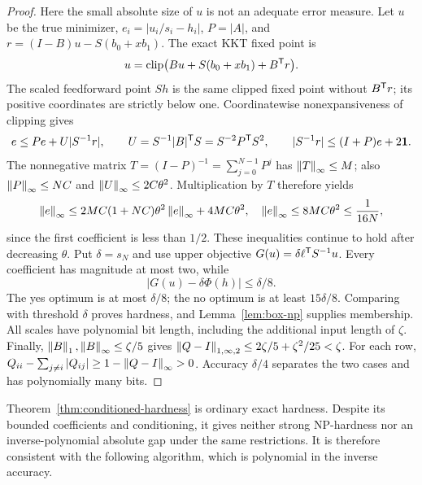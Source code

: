 \begin{proof}
Here the small absolute size of \(u\) is not an adequate error measure.
Let \(u\) be the true minimizer, \(e_i=|u_i/s_i-h_i|\),
\(P=|A|\), and \(r=(I-B)u-S(b_0+xb_1)\). The exact KKT fixed point is
\[
 u=\operatorname{clip}\bigl(Bu+S(b_0+xb_1)+B^{\mathsf T} r\bigr).
\]
The scaled feedforward point \(Sh\) is the same clipped fixed point without
\(B^{\mathsf T} r\); its positive coordinates are strictly below one.
Coordinatewise nonexpansiveness of clipping gives
\[
 e\le Pe+U|S^{-1}r|,\qquad
 U=S^{-1}|B|^{\mathsf T} S=S^{-2}P^{\mathsf T} S^2,
 \qquad |S^{-1}r|\le(I+P)e+2\mathbf1.
\]
The nonnegative matrix \(T=(I-P)^{-1}=\sum_{j=0}^{N-1}P^j\) has
\(\left\lVert T\right\rVert_\infty\le M\); also \(\left\lVert P\right\rVert_\infty\le NC\) and
\(\left\lVert U\right\rVert_\infty\le2C\theta^2\). Multiplication by \(T\) therefore yields
\[
 \left\lVert e\right\rVert_\infty\le 2MC(1+NC)\theta^2\left\lVert e\right\rVert_\infty+4MC\theta^2,
 \quad
 \left\lVert e\right\rVert_\infty\le8MC\theta^2\le\frac1{16N},
\]
since the first coefficient is less than \(1/2\). These inequalities continue
to hold after decreasing \(\theta\).
Put \(\delta=s_N\) and use upper objective \(G(u)=\delta\ell^{\mathsf T} S^{-1}u\).
Every coefficient has magnitude at most two, while
\[
 |G(u)-\delta\Phi(h)|\le\delta/8.
\]
The yes optimum is at most \(\delta/8\); the no optimum is at least
\(15\delta/8\). Comparing with threshold \(\delta\) proves hardness, and
Lemma~\ref{lem:box-np} supplies membership. All scales have polynomial bit
length, including the additional input length of \(\zeta\).
Finally, \(\left\lVert B\right\rVert_1,\left\lVert B\right\rVert_\infty\le\zeta/5\) gives
\(\left\lVert Q-I\right\rVert_{1,\infty,2}\le2\zeta/5+\zeta^2/25<\zeta\).
For each row, \(Q_{ii}-\sum_{j\ne i}|Q_{ij}|\ge1-\left\lVert Q-I\right\rVert_\infty>0\).
Accuracy \(\delta/4\) separates the two cases and has polynomially many bits.
\end{proof}
Theorem~\ref{thm:conditioned-hardness} is ordinary exact hardness. Despite
its bounded coefficients and conditioning, it gives neither strong NP-hardness
nor an inverse-polynomial absolute gap under the same restrictions. It is
therefore consistent with the following algorithm, which is polynomial in the
inverse accuracy.

